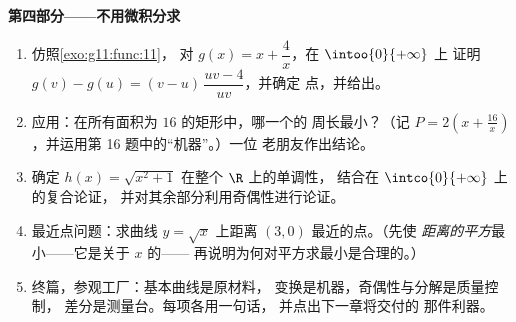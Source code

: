 \begin{problem}
\medskip
\noindent\textbf{第四部分——不用微积分求}
\begin{enumerate}[resume]
  \item 仿照\cref{exo:g11:func:11}，
        对 $g(x) = x + \dfrac4x$，在 $\intoo{0}{+\infty}$ 上
        证明 $g(v) - g(u) = (v - u)\,\dfrac{uv - 4}{uv}$，并确定
        点，并给出。
  \item 应用：在所有面积为 $16$ 的矩形中，哪一个的
        周长最小？（记 $P = 2\left(x +
        \frac{16}{x}\right)$，并运用第 16 题中的“机器”。）一位
        老朋友作出结论。
  \item 确定
        $h(x) = \sqrt{x^2 + 1}$ 在整个 $\R$ 上的单调性，
        结合在 $\intco{0}{+\infty}$ 上的复合论证，
        并对其余部分利用奇偶性进行论证。
  \item 最近点问题：求曲线
        $y = \sqrt x$ 上距离 $(3, 0)$ 最近的点。（先使
        \emph{距离的平方}最小——它是关于 $x$ 的——
        再说明为何对平方求最小是合理的。）
  \item 终篇，参观工厂：基本曲线是原材料，
        变换是机器，奇偶性与分解是质量控制，
        差分是测量台。每项各用一句话，
        并点出下一章将交付的
        那件利器。
\end{enumerate}
\end{problem}
